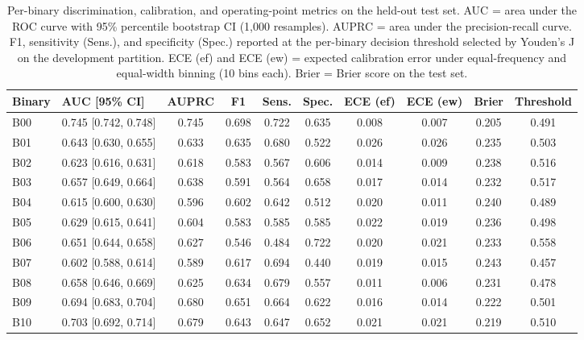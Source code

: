 \documentclass[utf8]{FrontiersinHarvard} %
\begin{document}
\begin{table}[t]
\centering
\caption{Per-binary discrimination, calibration, and operating-point metrics on the held-out test set. AUC = area under the ROC curve with 95\% percentile bootstrap CI (1{,}000 resamples). AUPRC = area under the precision-recall curve. F1, sensitivity (Sens.), and specificity (Spec.) reported at the per-binary decision threshold selected by Youden's J on the development partition. ECE (ef) and ECE (ew) = expected calibration error under equal-frequency and equal-width binning (10 bins each). Brier = Brier score on the test set.}
\label{tab:results_metrics}
\footnotesize
\setlength{\tabcolsep}{4pt}
\renewcommand{\arraystretch}{1.15}
\begin{tabular}{@{}l l c c c c c c c c@{}}
\toprule
\textbf{Binary} & \textbf{AUC [95\% CI]} & \textbf{AUPRC} & \textbf{F1} & \textbf{Sens.} & \textbf{Spec.} & \textbf{ECE (ef)} & \textbf{ECE (ew)} & \textbf{Brier} & \textbf{Threshold} \\
\midrule
B00 & 0.745 [0.742, 0.748] & 0.745 & 0.698 & 0.722 & 0.635 & 0.008 & 0.007 & 0.205 & 0.491 \\
B01 & 0.643 [0.630, 0.655] & 0.633 & 0.635 & 0.680 & 0.522 & 0.026 & 0.026 & 0.235 & 0.503 \\
B02 & 0.623 [0.616, 0.631] & 0.618 & 0.583 & 0.567 & 0.606 & 0.014 & 0.009 & 0.238 & 0.516 \\
B03 & 0.657 [0.649, 0.664] & 0.638 & 0.591 & 0.564 & 0.658 & 0.017 & 0.014 & 0.232 & 0.517 \\
B04 & 0.615 [0.600, 0.630] & 0.596 & 0.602 & 0.642 & 0.512 & 0.020 & 0.011 & 0.240 & 0.489 \\
B05 & 0.629 [0.615, 0.641] & 0.604 & 0.583 & 0.585 & 0.585 & 0.022 & 0.019 & 0.236 & 0.498 \\
B06 & 0.651 [0.644, 0.658] & 0.627 & 0.546 & 0.484 & 0.722 & 0.020 & 0.021 & 0.233 & 0.558 \\
B07 & 0.602 [0.588, 0.614] & 0.589 & 0.617 & 0.694 & 0.440 & 0.019 & 0.015 & 0.243 & 0.457 \\
B08 & 0.658 [0.646, 0.669] & 0.625 & 0.634 & 0.679 & 0.557 & 0.011 & 0.006 & 0.231 & 0.478 \\
B09 & 0.694 [0.683, 0.704] & 0.680 & 0.651 & 0.664 & 0.622 & 0.016 & 0.014 & 0.222 & 0.501 \\
B10 & 0.703 [0.692, 0.714] & 0.679 & 0.643 & 0.647 & 0.652 & 0.021 & 0.021 & 0.219 & 0.510 \\
\bottomrule
\end{tabular}
\end{table}
\end{document}
